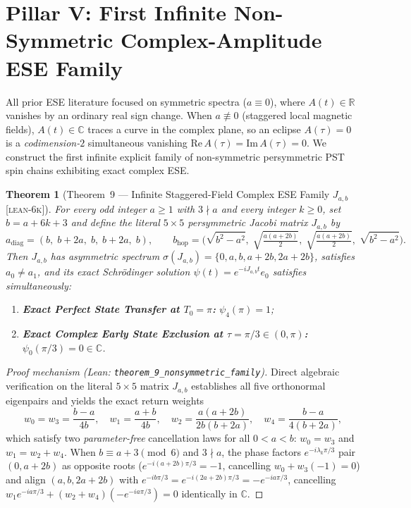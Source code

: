\documentclass[11pt,reqno]{amsart}
\newtheorem{theorem}{Theorem}[section]
\theoremstyle{definition}
\newcommand{\R}{\mathbb{R}}
\newcommand{\C}{\mathbb{C}}
\newcommand{\taglean}{\textsc{[lean-6k]}}
\newcommand{\id}[1]{\textnormal{\texttt{\small #1}}}
\begin{document}
\section{Pillar V: First Infinite Non-Symmetric Complex-Amplitude ESE Family}
\label{sec:nonsym}

All prior ESE literature focused on symmetric spectra ($a\equiv 0$), where $A(t)\in\R$ vanishes by an ordinary real sign change. When $a\not\equiv 0$ (staggered local magnetic fields), $A(t)\in\C$ traces a curve in the complex plane, so an eclipse $A(\tau)=0$ is a \emph{codimension-$2$} simultaneous vanishing $\mathrm{Re}\,A(\tau)=\mathrm{Im}\,A(\tau)=0$. We construct the first infinite explicit family of non-symmetric persymmetric PST spin chains exhibiting exact complex ESE.

\begin{theorem}[Theorem~9 --- Infinite Staggered-Field Complex ESE Family $J_{a,b}$ \taglean{}]
\label{thm:j_ab}
For every odd integer $a\ge 1$ with $3\nmid a$ and every integer $k\ge 0$, set $b=a+6k+3$ and define the literal $5\times 5$ persymmetric Jacobi matrix $J_{a,b}$ by
\[
a_{\mathrm{diag}} = (b,\;b+2a,\;b,\;b+2a,\;b), \qquad
b_{\mathrm{hop}} = \Big(\sqrt{b^2-a^2},\;\sqrt{\tfrac{a(a+2b)}{2}},\;\sqrt{\tfrac{a(a+2b)}{2}},\;\sqrt{b^2-a^2}\Big).
\]
Then $J_{a,b}$ has asymmetric spectrum $\sigma(J_{a,b}) = \{0,a,b,a+2b,2a+2b\}$, satisfies $a_0\neq a_1$, and its exact Schr\"{o}dinger solution $\psi(t)=e^{-i J_{a,b} t}e_0$ satisfies simultaneously:
\begin{enumerate}
\item \textbf{Exact Perfect State Transfer at $T_0=\pi$:} $\psi_4(\pi) = 1$;
\item \textbf{Exact Complex Early State Exclusion at $\tau=\pi/3\in(0,\pi)$:} $\psi_0(\pi/3) = 0 \in \C$.
\end{enumerate}
\end{theorem}

\begin{proof}[Proof mechanism (Lean: \id{theorem\_9\_nonsymmetric\_family})]
Direct algebraic verification on the literal $5\times 5$ matrix $J_{a,b}$ establishes all five orthonormal eigenpairs and yields the exact return weights
\[
w_0=w_3=\frac{b-a}{4b}, \quad w_1=\frac{a+b}{4b}, \quad w_2=\frac{a(a+2b)}{2b(b+2a)}, \quad w_4=\frac{b-a}{4(b+2a)},
\]
which satisfy two \emph{parameter-free} cancellation laws for all $0<a<b$: $w_0=w_3$ and $w_1=w_2+w_4$. When $b\equiv a+3\pmod{6}$ and $3\nmid a$, the phase factors $e^{-i\lambda_k \pi/3}$ pair $(0,a+2b)$ as opposite roots ($e^{-i(a+2b)\pi/3}=-1$, cancelling $w_0+w_3(-1)=0$) and align $(a,b,2a+2b)$ with $e^{-ib\pi/3}=e^{-i(2a+2b)\pi/3}=-e^{-ia\pi/3}$, cancelling $w_1 e^{-ia\pi/3} + (w_2+w_4)(-e^{-ia\pi/3})=0$ identically in $\C$.
\end{proof}
\end{document}
